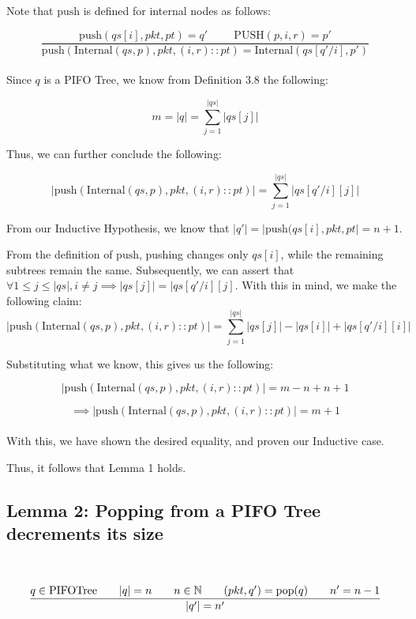 \documentclass{article}
\begin{document}
Note that $\text{push}$ is defined for internal nodes as follows:

$$\frac{\text{push}(qs[i], pkt, pt) = q' \hspace{1cm} \text{PUSH}(p, i, r) = p'}{\text{push}(\text{Internal}(qs, p), pkt, (i, r) :: pt) = \text{Internal}(qs[q'/i], p')}$$\\[-10pt]

Since $q$ is a PIFO Tree, we know from Definition 3.8 the following:

$$m = |q| = \sum_{j=1}^{|qs|} |qs[j]|$$

Thus, we can further conclude the following:

$$|\text{push}(\text{Internal}(qs, p), pkt, (i, r) :: pt)| = \sum_{j=1}^{|qs|} |qs[q'/i][j]|$$

From our Inductive Hypothesis, we know that $|q'| = |\text{push}(qs[i], pkt, pt| = n+1$.\newline

From the definition of $\text{push}$, pushing changes only $qs[i]$, while the remaining subtrees remain the same. Subsequently, we can assert that $\forall 
1 \leq j \leq |qs|, i \neq j \implies |qs[j]| = |qs[q'/i][j]$. With this in mind, we make the following claim:\\[-15pt]

$$|\text{push}(\text{Internal}(qs, p), pkt, (i, r) :: pt)| = \sum_{j=1}^{|qs|} |qs[j]| - |qs[i]| + |qs[q'/i][i]|$$

Substituting what we know, this gives us the following:

$$|\text{push}(\text{Internal}(qs, p), pkt, (i, r) :: pt)| = m - n + n + 1$$

$$\implies |\text{push}(\text{Internal}(qs, p), pkt, (i, r) :: pt)| = m + 1$$\\[-15pt]

With this, we have shown the desired equality, and proven our Inductive case.\newline

Thus, it follows that Lemma 1 holds.\newline

\subsection{Lemma 2: Popping from a PIFO Tree decrements its size}

\par\

$$\frac{q \in \text{PIFOTree} \hspace{0.7cm} |q| = n \hspace{0.7cm} n \in \mathbb{N} \hspace{0.7cm} (pkt, q') = \text{pop}(q) \hspace{0.7cm} n' = n-1}{|q'| = n'}$$
\end{document}
